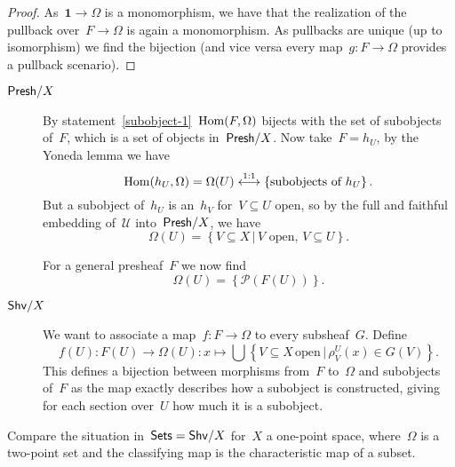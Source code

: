\documentclass[a4paper,11pt,oneside,openany,article]{memoir}
\begin{document}
\begin{enumerate}
    \begin{proof}
      As~$\textbf{1}\to\Omega$ is a monomorphism, we have that the realization of the pullback over~$F\to\Omega$ is again a monomorphism. As pullbacks are unique (up to isomorphism) we find the bijection (and vice versa every map~$g\colon F\to\Omega$ provides a pullback scenario).
    \end{proof}

    \begin{solution}
      \begin{description}
        \item[$\mathsf{Presh}/X$] By statement~\ref{subobject-1}~$\operatorname{Hom}(F,\Omega)$ bijects with the set of subobjects of~$F$, which is a set of objects in~$\mathsf{Presh}/X$. Now take~$F=h_U$, by the Yoneda lemma we have
          \begin{equation}
            \operatorname{Hom}(h_U,\Omega)=\Omega(U)\overset{1:1}{\longleftrightarrow}\left\{ \text{subobjects of~$h_U$} \right\}.
          \end{equation}
          But a subobject of~$h_U$ is an~$h_V$ for~$V\subseteq U$ open, so by the full and faithful embedding of~$\mathcal{U}$ into~$\mathsf{Presh}/X$, we have
          \begin{equation}
            \Omega(U)=\left\{ V\subseteq X\,|\,\text{$V$ open, $V\subseteq U$} \right\}.
          \end{equation}

          For a general presheaf~$F$ we now find
          \begin{equation}
            \Omega(U)=\left\{ \mathcal{P}\left( F(U) \right) \right\}.
          \end{equation}

        \item[$\mathsf{Shv}/X$] We want to associate a map~$f\colon F\to\Omega$ to every subsheaf~$G$. Define
          \begin{equation}
            f(U)\colon F(U)\to\Omega(U):x\mapsto\bigcup\left\{ V\subseteq X\,\text{open}\,|\,\rho^U_V(x)\in G(V) \right\}.
          \end{equation}
          This defines a bijection between morphisms from~$F$ to~$\Omega$ and subobjects of~$F$ as the map exactly describes how a subobject is constructed, giving for each section over~$U$ how much it is a subobject.
      \end{description}
    \end{solution}

    Compare the situation in~$\mathsf{Sets}=\mathsf{Shv}/X$ for~$X$ a one-point space, where~$\Omega$ is a two-point set and the classifying map is the characteristic map of a subset.
    

\end{enumerate}
\end{document}
